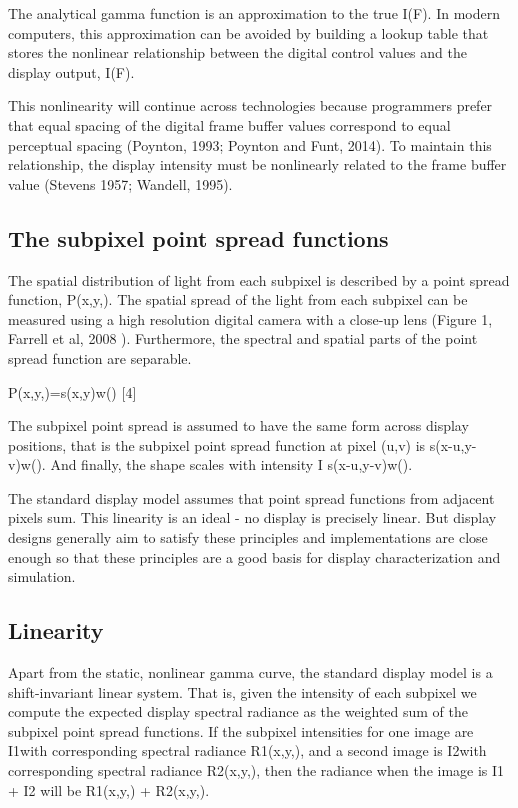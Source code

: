 \documentclass[
  letterpaper,
]{book}
\begin{document}
The analytical gamma function is an approximation to the true I(F). In
modern computers, this approximation can be avoided by building a lookup
table that stores the nonlinear relationship between the digital control
values and the display output, I(F).

This nonlinearity will continue across technologies because programmers
prefer that equal spacing of the digital frame buffer values correspond
to equal perceptual spacing (Poynton, 1993; Poynton and Funt, 2014). To
maintain this relationship, the display intensity must be nonlinearly
related to the frame buffer value (Stevens 1957; Wandell, 1995).

\subsection{The subpixel point spread
functions}\label{the-subpixel-point-spread-functions}

The spatial distribution of light from each subpixel is described by a
point spread function, P(x,y,). The spatial spread of the light from
each subpixel can be measured using a high resolution digital camera
with a close-up lens (Figure 1, Farrell et al, 2008 ). Furthermore, the
spectral and spatial parts of the point spread function are separable.

P(x,y,)=s(x,y)w() {[}4{]}

The subpixel point spread is assumed to have the same form across
display positions, that is the subpixel point spread function at pixel
(u,v) is s(x-u,y-v)w(). And finally, the shape scales with intensity I
s(x-u,y-v)w().

The standard display model assumes that point spread functions from
adjacent pixels sum. This linearity is an ideal - no display is
precisely linear. But display designs generally aim to satisfy these
principles and implementations are close enough so that these principles
are a good basis for display characterization and simulation.

\subsection{\texorpdfstring{\textbf{Linearity}}{Linearity}}\label{linearity-1}

Apart from the static, nonlinear gamma curve, the standard display model
is a shift-invariant linear system. That is, given the intensity of each
subpixel we compute the expected display spectral radiance as the
weighted sum of the subpixel point spread functions. If the subpixel
intensities for one image are I1with corresponding spectral radiance
R1(x,y,), and a second image is I2with corresponding spectral radiance
R2(x,y,), then the radiance when the image is I1 + I2 will be R1(x,y,) +
R2(x,y,).
\end{document}
